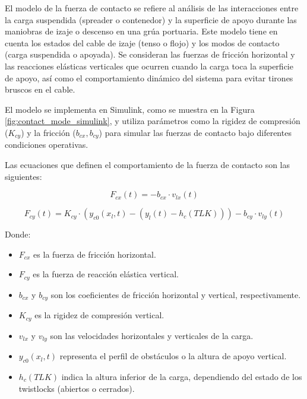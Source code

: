 \documentclass{article}
\begin{document}
                El modelo de la fuerza de contacto se refiere al análisis de las interacciones entre la carga suspendida (spreader o contenedor) y la superficie de apoyo durante las maniobras de izaje o descenso en una grúa portuaria. Este modelo tiene en cuenta los estados del cable de izaje (tenso o flojo) y los modos de contacto (carga suspendida o apoyada). Se consideran las fuerzas de fricción horizontal y las reacciones elásticas verticales que ocurren cuando la carga toca la superficie de apoyo, así como el comportamiento dinámico del sistema para evitar tirones bruscos en el cable.
    
                El modelo se implementa en Simulink, como se muestra en la Figura \ref{fig:contact_mode_simulink}, y utiliza parámetros como la rigidez de compresión ($K_{cy}$) y la fricción ($b_{cx}, b_{cy}$) para simular las fuerzas de contacto bajo diferentes condiciones operativas. 
    
                Las ecuaciones que definen el comportamiento de la fuerza de contacto son las siguientes:
    
                \begin{equation}
                F_{cx}(t) = -b_{cx} \cdot v_{lx}(t)
                \end{equation}
    
                \begin{equation}
                F_{cy}(t) = K_{cy} \cdot (y_{c0}(x_l, t) - (y_l(t) - h_c(TLK))) - b_{cy} \cdot v_{ly}(t)
                \end{equation}
    
                Donde:
                \begin{itemize}
                    \item $F_{cx}$ es la fuerza de fricción horizontal.
                    \item $F_{cy}$ es la fuerza de reacción elástica vertical.
                    \item $b_{cx}$ y $b_{cy}$ son los coeficientes de fricción horizontal y vertical, respectivamente.
                    \item $K_{cy}$ es la rigidez de compresión vertical.
                    \item $v_{lx}$ y $v_{ly}$ son las velocidades horizontales y verticales de la carga.
                    \item $y_{c0}(x_l, t)$ representa el perfil de obstáculos o la altura de apoyo vertical.
                    \item $h_c(TLK)$ indica la altura inferior de la carga, dependiendo del estado de los twistlocks (abiertos o cerrados).
                \end{itemize}
    
\end{document}
